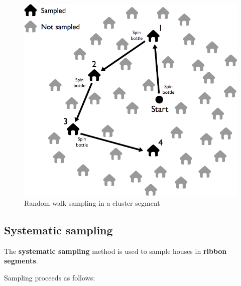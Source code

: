 \documentclass[12pt,a4paper]{book}
\theoremstyle{definition}
\theoremstyle{definition}
\theoremstyle{definition}
\theoremstyle{remark}
\begin{document}
\begin{figure}[H]

{\centering \includegraphics[width=8.38in]{figures/stage2sample8} 

}

\caption{Random walk sampling in a cluster segment}\label{fig:sample22}
\end{figure}

\hypertarget{systematic-sampling}{%
\subsection{Systematic sampling}\label{systematic-sampling}}

The \textbf{systematic sampling} method is used to sample houses in
\textbf{ribbon segments}.

Sampling proceeds as follows:
\end{document}
